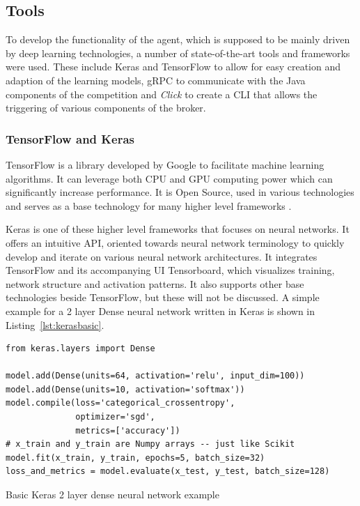 \subsection{Tools}

To develop the functionality of the agent, which is supposed to be mainly driven by deep learning technologies, a number
of state-of-the-art tools and frameworks were  used. These include
Keras and TensorFlow to allow for easy creation and adaption of the learning models,
\ac{gRPC} to communicate with the Java components of the competition and
\emph{Click} to create a \ac{CLI} that allows the triggering of various components of the broker.



\subsubsection{TensorFlow and Keras}%
\label{sub:tensorflow_and_keras}

TensorFlow is a library developed by Google to facilitate machine learning algorithms. It can leverage both \ac{CPU}
and \ac{GPU} computing power which can significantly increase performance. It is Open Source, used in various
technologies and serves as a base technology for many higher level frameworks \citep{tensorflow2015-whitepaper}.

Keras is one of these higher level frameworks that focuses on neural networks. It offers an intuitive \ac{API}, oriented towards
neural network terminology to quickly develop and iterate on various neural network architectures. It integrates TensorFlow and its
accompanying \ac{UI} Tensorboard, which visualizes training, network structure and activation patterns. It also supports
other base technologies beside TensorFlow, but these will not be discussed. A simple example for a 2 layer Dense neural network written in Keras is shown in Listing~\ref{lst:kerasbasic}.


\begin{listing}
    \begin{verbatim}
from keras.layers import Dense

model.add(Dense(units=64, activation='relu', input_dim=100))
model.add(Dense(units=10, activation='softmax'))
model.compile(loss='categorical_crossentropy',
              optimizer='sgd',
              metrics=['accuracy'])
# x_train and y_train are Numpy arrays -- just like Scikit
model.fit(x_train, y_train, epochs=5, batch_size=32)
loss_and_metrics = model.evaluate(x_test, y_test, batch_size=128)
    \end{verbatim}
    \caption{Basic Keras 2 layer dense neural network example}
    \label{lst:kerasbasic}
\end{listing}

